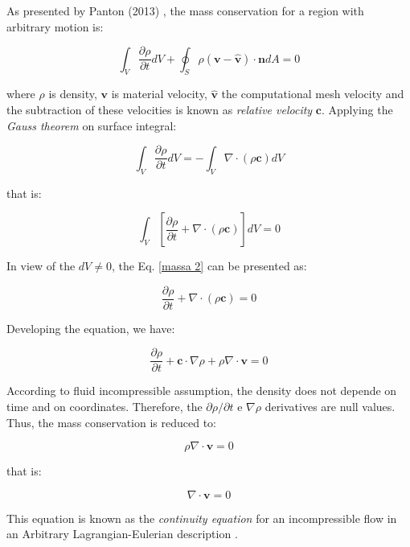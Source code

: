 As presented by Panton (2013) \cite{panton2013},
the mass conservation for a region with arbitrary motion is:

\begin{equation} \label{mass arbitrary domain panton}
 \int_{V} \frac{\partial \rho}{\partial t} dV
 + 
 \oint_{S} \rho 
 \left( \textbf{v} - \hat{\textbf{v}} \right) 
 \cdot \textbf{n} dA
 = 0
\end{equation}

\medskip
\noindent 
where $\rho$ is density, 
$\textbf{v}$ is material velocity,
$\hat{\textbf{v}}$ the computational mesh velocity and
the subtraction of these velocities is known as
\textit{relative velocity} $\textbf{c}$.
Applying the \textit{Gauss theorem} on surface integral:

\begin{equation}
 \int_{V} \frac{\partial \rho}{\partial t} dV
 = - 
 \int_{V} \nabla \cdot \left( \rho \textbf{c} \right) dV
\end{equation}

\medskip
\noindent
that is:

\begin{equation} \label{massa 2}
 \int_{V} \left[ \frac{\partial \rho}{\partial t}
 + 
 \nabla \cdot 
\left( \rho \textbf{c} \right) 
\right] dV 
 = 0 
\end{equation}

\medskip
\noindent 
In view of the $dV \neq 0$,
the Eq. \ref{massa 2} can be presented as:

\begin{equation} \label{continuity equation}
 \frac{\partial \rho}{\partial t}
 + 
 \nabla \cdot 
\left( \rho \textbf{c} \right) 
 = 0 
\end{equation}

\medskip
\noindent
Developing the equation, we have:

\begin{equation}
 \frac{\partial \rho}{\partial t}
 +
 \textbf{c} \cdot \nabla \rho
 +
 \rho \nabla \cdot \textbf{v}
 = 0
\end{equation}

\medskip
According to fluid incompressible assumption,
the density does not depende on time and on coordinates.
Therefore, the 
$\partial \rho / \partial t$ e $\nabla \rho$ derivatives are 
null values.
Thus, the mass conservation is reduced to:

\begin{equation} \label{massa 3}
 \rho \nabla \cdot \textbf{v}
 = 0 
\end{equation}

\medskip
\noindent that is:

\begin{equation} \label{incompressible continuity equation}
 \nabla \cdot \textbf{v}
 = 0 
\end{equation}

\medskip
\noindent 
This equation is known as the \textit{continuity equation} 
for an incompressible flow
in an Arbitrary Lagrangian-Eulerian description \cite{donea1982}.




